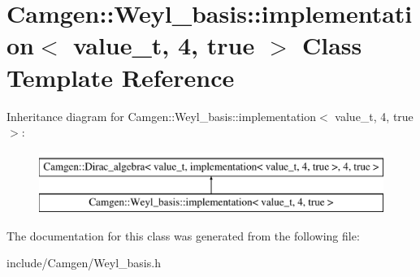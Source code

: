 \hypertarget{a00305}{}\section{Camgen\+:\+:Weyl\+\_\+basis\+:\+:implementation$<$ value\+\_\+t, 4, true $>$ Class Template Reference}
\label{a00305}
Inheritance diagram for Camgen\+:\+:Weyl\+\_\+basis\+:\+:implementation$<$ value\+\_\+t, 4, true $>$\+:\begin{figure}[H]
\begin{center}
\leavevmode
\includegraphics[height=2.000000cm]{a00305}
\end{center}
\end{figure}


The documentation for this class was generated from the following file\+:\begin{DoxyCompactItemize}
\item 
include/\+Camgen/Weyl\+\_\+basis.\+h\end{DoxyCompactItemize}
